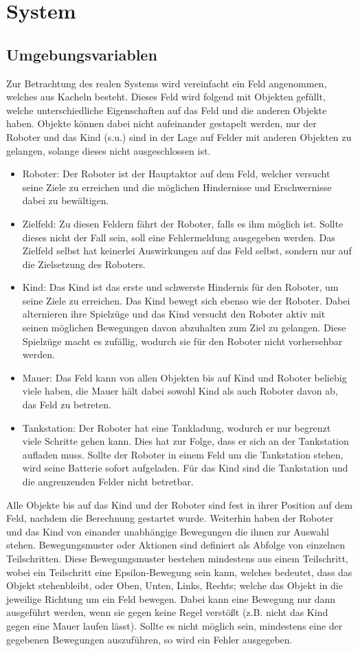 \section{System}
\subsection{Umgebungsvariablen}
Zur Betrachtung des realen Systems wird vereinfacht ein Feld angenommen, welches aus Kacheln besteht. Dieses Feld wird folgend mit Objekten gefüllt, welche unterschiedliche Eigenschaften auf das Feld und die anderen Objekte haben. Objekte können dabei nicht aufeinander gestapelt werden, nur der Roboter und das Kind (s.u.) sind in der Lage auf Felder mit anderen Objekten zu gelangen, solange dieses nicht ausgeschlossen ist.
\begin{itemize}
	\item Roboter: Der Roboter ist der Hauptaktor auf dem Feld, welcher versucht seine Ziele zu erreichen und die möglichen Hindernisse und Erschwernisse dabei zu bewältigen.
	\item Zielfeld: Zu diesen Feldern fährt der Roboter, falls es ihm möglich ist. Sollte dieses nicht der Fall sein, soll eine Fehlermeldung ausgegeben werden. Das Zielfeld selbst hat keinerlei Auswirkungen auf das Feld selbst, sondern nur auf die Zielsetzung des Roboters.
	\item Kind: Das Kind ist das erste und schwerste Hindernis für den Roboter, um seine Ziele zu erreichen. Das Kind bewegt sich ebenso wie der Roboter. Dabei alternieren ihre Spielzüge und das Kind versucht den Roboter aktiv mit seinen möglichen Bewegungen davon abzuhalten zum Ziel zu gelangen. Diese Spielzüge macht es zufällig, wodurch sie für den Roboter nicht vorhersehbar werden.
	\item Mauer: Das Feld kann von allen Objekten bis auf Kind und Roboter beliebig viele haben, die Mauer hält dabei sowohl Kind als auch Roboter davon ab, das Feld zu betreten.
	\item Tankstation: Der Roboter hat eine Tankladung, wodurch er nur begrenzt viele Schritte gehen kann. Dies hat zur Folge, dass er sich an der Tankstation aufladen muss. Sollte der Roboter in einem Feld um die Tankstation stehen, wird seine Batterie sofort aufgeladen. Für das Kind sind die Tankstation und die angrenzenden Felder nicht betretbar.
\end{itemize}
Alle Objekte bis auf das Kind und der Roboter sind fest in ihrer Position auf dem Feld, nachdem die Berechnung gestartet wurde. Weiterhin haben der Roboter und das Kind von einander unabhängige Bewegungen die ihnen zur Auswahl stehen. Bewegungsmuster oder Aktionen sind definiert als Abfolge von einzelnen Teilschritten. Diese Bewegungsmuster bestehen mindestens aus einem Teilschritt, wobei ein Teilschritt eine Epsilon-Bewegung sein kann, welches bedeutet, dass das Objekt stehenbleibt, oder Oben, Unten, Links, Rechts; welche das Objekt in die jeweilige Richtung um ein Feld bewegen. Dabei kann eine Bewegung nur dann ausgeführt werden, wenn sie gegen keine Regel verstößt (z.B. nicht das Kind gegen eine Mauer laufen lässt). Sollte es nicht möglich sein, mindestens eine der gegebenen Bewegungen auszuführen, so wird ein Fehler ausgegeben. \\
